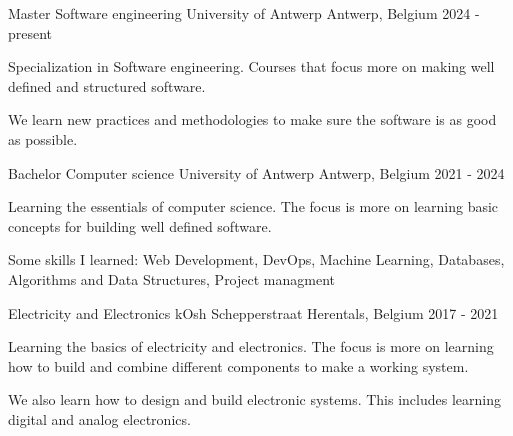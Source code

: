 

\begin{cventries}

  \cventry
    {Master Software engineering} %
    {University of Antwerp} %
    {Antwerp, Belgium} %
    {2024 - present} %
    {
      \begin{cvitems} %
        \item {Specialization in Software engineering. Courses that focus more on making well defined and structured software.}
        \item {We learn new practices and methodologies to make sure the software is as good as possible.}
      \end{cvitems}
    }

  \cventry
    {Bachelor Computer science} %
    {University of Antwerp} %
    {Antwerp, Belgium} %
    {2021 - 2024} %
    {
      \begin{cvitems} %
        \item {Learning the essentials of computer science. The focus is more on learning basic concepts for building well defined software.}
        \item {Some skills I learned: Web Development, DevOps, Machine Learning, Databases, Algorithms and Data Structures, Project managment}
      \end{cvitems}
    }

  \cventry
    {Electricity and Electronics} %
    {kOsh Schepperstraat} %
    {Herentals, Belgium} %
    {2017 - 2021} %
    {
      \begin{cvitems} %
        \item {Learning the basics of electricity and electronics. The focus is more on learning how to build and combine different components to make a working system.}
        \item {We also learn how to design and build electronic systems. This includes learning digital and analog electronics.}
      \end{cvitems}
    }
\end{cventries}
